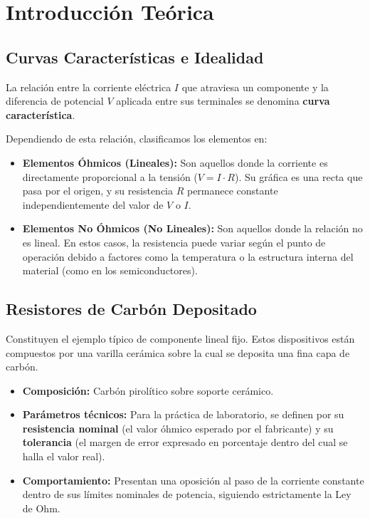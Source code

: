 \section{Introducción Teórica}

\subsection{Curvas Características e Idealidad}
La relación entre la corriente eléctrica $I$ que atraviesa un componente y la diferencia de potencial $V$ aplicada entre sus terminales se denomina \textbf{curva característica}.

Dependiendo de esta relación, clasificamos los elementos en:
\begin{itemize}
    \item \textbf{Elementos Óhmicos (Lineales):} Son aquellos donde la corriente es directamente proporcional a la tensión ($V = I \cdot R$). Su gráfica es una recta que pasa por el origen, y su resistencia $R$ permanece constante independientemente del valor de $V$ o $I$.
    \item \textbf{Elementos No Óhmicos (No Lineales):} Son aquellos donde la relación no es lineal. En estos casos, la resistencia puede variar según el punto de operación debido a factores como la temperatura o la estructura interna del material (como en los semiconductores).
\end{itemize}

\vspace{0.5cm}

\subsection{Resistores de Carbón Depositado}
Constituyen el ejemplo típico de componente lineal fijo. Estos dispositivos están compuestos por una varilla cerámica sobre la cual se deposita una fina capa de carbón.
\begin{itemize}
    \item \textbf{Composición:} Carbón pirolítico sobre soporte cerámico.
    \item \textbf{Parámetros técnicos:} Para la práctica de laboratorio, se definen por su \textbf{resistencia nominal} (el valor óhmico esperado por el fabricante) y su \textbf{tolerancia} (el margen de error expresado en porcentaje dentro del cual se halla el valor real).
    \item \textbf{Comportamiento:} Presentan una oposición al paso de la corriente constante dentro de sus límites nominales de potencia, siguiendo estrictamente la Ley de Ohm.
\end{itemize}

